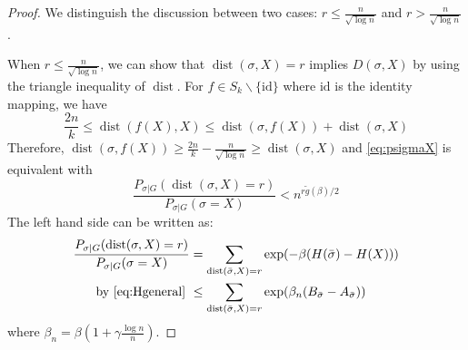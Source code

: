 \documentclass[entropy,article,submit,moreauthors,pdftex]{Definitions/mdpi}
\newcommand{\1}{\mathbbm{1}}
\DeclareMathOperator{\Dist}{dist}
\begin{document}
\begin{proof}
We distinguish the discussion between two cases: $r\leq \frac{n}{\sqrt{\log n}}$
and $r > \frac{n}{\sqrt{\log n}}$.

When $r\leq \frac{n}{\sqrt{\log n}}$, we can show that $\Dist(\sigma, X) = r$ implies $D(\sigma, X)$ by using the triangle
inequality of $\Dist$. For $f \in S_k \backslash \{ \textrm{id} \}$ where $\textrm{id}$ is the identity mapping, we have
$$
\frac{2n}{k} \leq \Dist(f(X), X) \leq \Dist(\sigma, f(X)) + \Dist(\sigma, X)
$$
Therefore, $\Dist(\sigma, f(X)) \geq \frac{2n}{k} - \frac{n}{\sqrt{\log n}} \geq \Dist(\sigma, X)$ and
\eqref{eq:psigmaX} is equivalent with
\begin{equation}\label{eq:psigmaX2}
\frac{P_{\sigma|G}(\Dist(\sigma, X)=r)}
{P_{\sigma|G}(\sigma=X)} <
n^{r \tilde{g}(\beta) /2}
\end{equation}
The left hand side can be written as:
\begin{align*}
\frac{P_{\sigma|G}(\Dist(\sigma, X)=r)}
{P_{\sigma|G}(\sigma=X)}  &= \sum_{\Dist(\bar{\sigma}, X)=r}\exp(-\beta(H(\bar{\sigma})-H(X)))\\
\textrm{ by \eqref{eq:Hgeneral} } &\leq \sum_{\Dist(\bar{\sigma}, X)=r}\exp(\beta_n(B_{\bar{\sigma}}-A_{\bar{\sigma}}))
\end{align*}
where $\beta_n = \beta(1+\gamma\frac{\log n}{n})$.


\end{proof}
\end{document}
